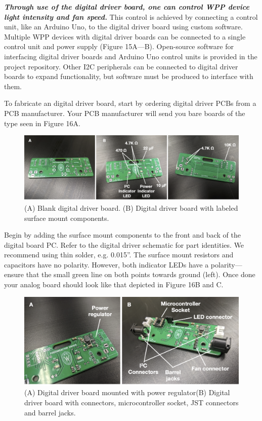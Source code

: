 \documentclass[11pt]{article}
\begin{document}
\textbf{\textit{Through use of the digital driver board, one can control WPP device light intensity and fan speed.}} This control is achieved by connecting a control unit, like an Arduino Uno, to the digital driver board using custom software. Multiple WPP devices with digital driver boards can be connected to a single control unit and power supply (Figure 15A---B). Open-source software for interfacing digital driver boards and Arduino Uno control units is provided in the project repository. Other I2C peripherals can be connected to digital driver boards to expand functionality, but software must be produced to interface with them.

To fabricate an digital driver board, start by ordering digital driver PCBs from a PCB manufacturer. Your PCB manufacturer will send you bare boards of the type seen in Figure 16A.

\begin{figure}[H]
	\centering
	\includegraphics[width=\textwidth]{"./fig16.png"}
	\caption{(A) Blank digital driver board. (B) Digital driver board with labeled surface mount components.}
\end{figure}

Begin by adding the surface mount components to the front and back of the digital board PC.
Refer to the digital driver schematic for part identities.
We recommend using thin solder, e.g. 0.015''.
The surface mount resistors and capacitors have no polarity.
However, both  indicator LEDs  have a polarity---ensure that the small green line on both points towards ground (left).
Once done your analog board should look like that depicted in Figure 16B and C.

\begin{figure}[H]
	\centering
	\includegraphics[width=\textwidth]{"./fig17.png"}
	\caption{(A) Digital driver board mounted with power regulator(B) Digital driver board with connectors, microcontroller socket, JST connectors and barrel jacks.}
\end{figure}
\end{document}
